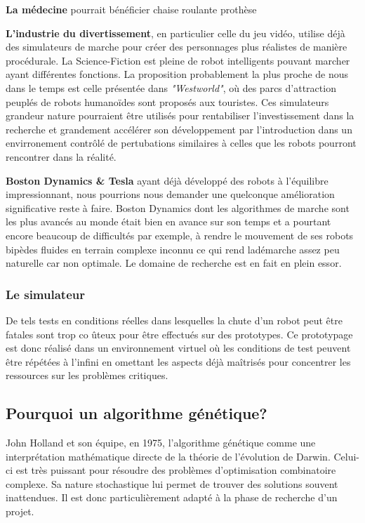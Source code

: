 \documentclass[journal, a4paper]{IEEEtran}
\begin{document}
	\textbf{La médecine} pourrait bénéficier chaise roulante prothèse

	\textbf{L'industrie du divertissement}, en particulier celle du
	jeu vidéo,
	utilise déjà des simulateurs de marche pour créer des personnages
	plus réalistes de manière procédurale.
	La Science-Fiction est pleine de robot intelligents pouvant
	marcher ayant différentes fonctions.
	La proposition probablement la plus proche de nous dans le
	temps est celle présentée dans \textit{"Westworld"}, où des parcs
	d'attraction peuplés de robots humanoïdes sont proposés aux
	touristes. Ces simulateurs grandeur nature pourraient être
	utilisés pour rentabiliser l'investissement dans la recherche
	et grandement accélérer son développement par l'introduction dans
	un envirronement contrôlé de
	pertubations similaires à celles que les robots pourront rencontrer
	dans
	la réalité.

	\textbf{Boston Dynamics \& Tesla} ayant déjà développé des robots
	à l'équilibre impressionnant, nous pourrions nous demander une
	quelconque amélioration significative reste à faire.
	Boston Dynamics dont les algorithmes de marche sont les plus
	avancés au monde était bien en avance sur son temps et a pourtant
	encore beaucoup de difficultés par exemple, à rendre le mouvement
	de
	ses robots
	bipèdes fluides en terrain complexe inconnu ce qui rend ladémarche
	assez peu naturelle car non optimale. Le
	domaine de recherche est en fait en plein essor.

	\subsubsection{Le simulateur}
	De tels tests en conditions réelles dans lesquelles la chute
	d'un robot peut être fatales sont trop co
	ûteux
	pour être effectués sur des prototypes.
	Ce prototypage est donc réalisé dans un environnement virtuel où les
	conditions de test peuvent être répétées à l'infini en omettant les
	aspects déjà maîtrisés pour concentrer les ressources sur les
	problèmes critiques.


	\subsection{Pourquoi un algorithme génétique?}\label{subsec:pourquoi-un-algorithme-genetique?}
	John Holland et son équipe, en 1975,
	l'algorithme génétique\cite{systems-adaptation} comme une
	interprétation mathématique directe de la théorie de l'évolution de
	Darwin.
	Celui-ci est très puissant pour résoudre des problèmes
	d'optimisation combinatoire complexe.
	Sa nature stochastique lui permet de trouver des solutions souvent
	inattendues. Il est donc particulièrement adapté à la phase de
	recherche d'un projet.
\end{document}
